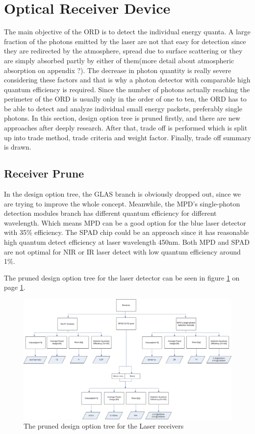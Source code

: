 \section{Optical Receiver Device}
\label{TOORD}
The main objective of the \ac{ORD} is to detect the individual energy quanta. A large fraction of the photons emitted by the \acs{laser} are not that easy for detection since they are redirected by the atmosphere, spread due to surface scattering or they are simply absorbed partly by either of them(more detail about atmospheric absorption on appendix ?). The decrease in photon quantity is really severe considering these factors and that is why a photon detector with comparable high quantum efficiency is required. Since the number of photons actually reaching the perimeter of the \ac{ORD} is usually only in the order of one to ten, the \acs{ORD} has to be able to detect and analyze individual small energy packets, preferably single photons. In this section, design option tree is pruned firstly, and there are new approaches after deeply research. After that, trade off is performed which is split up into trade method, trade criteria and weight factor. Finally, trade off summary is drawn.

\subsection{Receiver Prune}
\label{TOReceiverP}
In the design option tree, the GLAS branch is obviously dropped out, since we are trying to improve the whole concept. Meanwhile, the \ac{MPD}'s single-photon detection modules branch has different quantum efficiency for different wavelength. Which means MPD can be a good option for the blue laser detector with 35\% efficiency. The \ac{SPAD} chip could be an approach since it has reasonable high quantum detect efficiency at laser wavelength 450nm. Both \acs{MPD} and \acs{SPAD} are not optimal for \acs{NIR} or \acs{IR} laser detect with low quantum efficiency around 1\%. 

The pruned design option tree for the laser detector can be seen in figure \ref{fig:PrunedReceiver} on page \ref{fig:PrunedReceiver}.

\begin{figure}
\centering
\includegraphics[scale=0.7, angle=90]{chapters/img/DOTreceiverPruned.jpg}
\caption{The pruned design option tree for the Laser receivers}
\label{fig:PrunedReceiver}
\end{figure}

